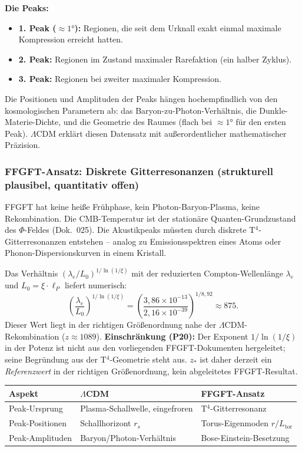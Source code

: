 \textbf{Die Peaks:}
\begin{itemize}
  \item \textbf{1. Peak ($\approx 1°$):} Regionen, die seit dem Urknall
        exakt einmal maximale Kompression erreicht hatten.
  \item \textbf{2. Peak:} Regionen im Zustand maximaler Rarefaktion
        (ein halber Zyklus).
  \item \textbf{3. Peak:} Regionen bei zweiter maximaler Kompression.
\end{itemize}

Die Positionen und Amplituden der Peaks hängen hochempfindlich von den
kosmologischen Parametern ab: das Baryon-zu-Photon-Verhältnis, die
Dunkle-Materie-Dichte, und die Geometrie des Raumes (flach bei $\approx 1°$
für den ersten Peak). $\Lambda$CDM erklärt diesen Datensatz mit
außerordentlicher mathematischer Präzision.

\subsubsection*{FFGFT-Ansatz: Diskrete Gitterresonanzen (strukturell plausibel,
quantitativ offen)}

FFGFT hat keine heiße Frühphase, kein Photon-Baryon-Plasma, keine
Rekombination. Die CMB-Temperatur ist der stationäre Quanten-Grundzustand
des $\Phi$-Feldes (Dok.~025). Die Akustikpeaks müssten durch diskrete
T$^4$-Gitterresonanzen entstehen -- analog zu Emissionsspektren eines
Atoms oder Phonon-Dispersionskurven in einem Kristall.

Das Verhältnis $(\lambda_e/L_0)^{1/\ln(1/\xi)}$ mit der reduzierten
Compton-Wellenlänge $\lambda_e$ und $L_0 = \xi\cdot\ell_P$ liefert numerisch:
\[
  \left(\frac{\lambda_e}{L_0}\right)^{1/\ln(1/\xi)}
  = \left(\frac{3{,}86\times10^{-13}}{2{,}16\times10^{-39}}\right)^{1/8{,}92}
  \approx 875.
\]
Dieser Wert liegt in der richtigen Größenordnung nahe der
$\Lambda$CDM-Rekombination ($z \approx 1089$). \textbf{Einschränkung (P20):}
Der Exponent $1/\ln(1/\xi)$ in der Potenz ist nicht aus den vorliegenden
FFGFT-Dokumenten hergeleitet; seine Begründung aus der T$^4$-Geometrie steht
aus. $z_*$ ist daher derzeit ein \emph{Referenzwert} in der richtigen
Größenordnung, kein abgeleitetes FFGFT-Resultat.

\begin{center}
\begin{tabular}{p{2.3cm}p{5.2cm}p{5.2cm}}
\toprule
\textbf{Aspekt} & \textbf{$\Lambda$CDM} & \textbf{FFGFT-Ansatz} \\
\midrule
Peak-Ursprung & Plasma-Schallwelle, eingefroren & T$^4$-Gitterresonanz \\
Peak-Positionen & Schallhorizont $r_s$ & Torus-Eigenmoden $r/L_\mathrm{tor}$ \\
Peak-Amplituden & Baryon/Photon-Verhältnis & Bose-Einstein-Besetzung \\
\bottomrule
\end{tabular}
\end{center}


